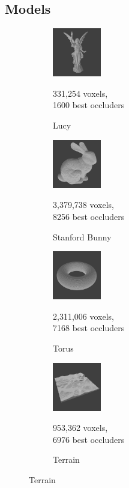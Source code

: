 \subsection*{Models} \label{subsec-models}


\begin{figure}[!htb]
  \begin{subfigure}{80px}
      \includegraphics[width=80px]{images/graphics/model-lucy.jpg}
      \caption{Lucy}
      \parbox{\linewidth}{\centering\footnotesize 331,254 voxels,\\ 1600 best occluders}
  \end{subfigure}
  \begin{subfigure}{80px}
      \includegraphics[width=80px]{images/graphics/model-bunny.jpg}
      \caption{Stanford Bunny}
      \parbox{\linewidth}{\centering\footnotesize 3,379,738 voxels,\\ 8256 best occluders}
  \end{subfigure}
  \begin{subfigure}{80px}
      \includegraphics[width=80px]{images/graphics/model-torus.jpg}
      \caption{Torus}
      \parbox{\linewidth}{\centering\footnotesize 2,311,006 voxels,\\ 7168 best occluders}
  \end{subfigure}
  \begin{subfigure}{80px}
      \includegraphics[width=80px]{images/graphics/model-terrain.jpg}
      \caption{Terrain}
      \parbox{\linewidth}{\centering\footnotesize 953,362 voxels,\\ 6976 best occluders}

\end{subfigure}
\end{figure}
